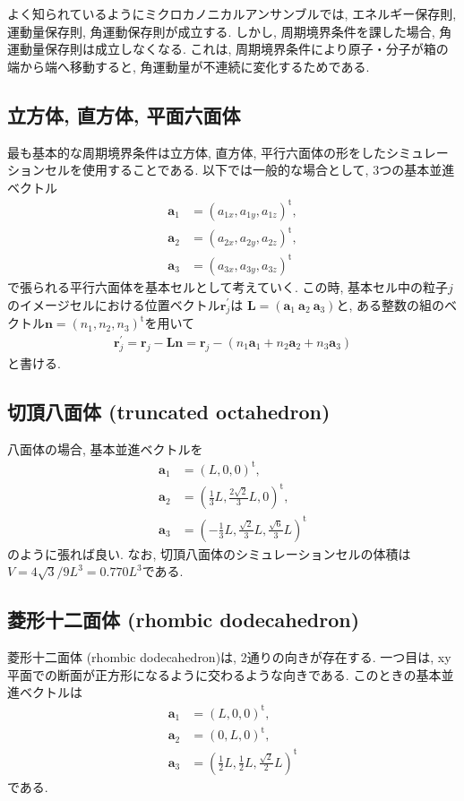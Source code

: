 よく知られているようにミクロカノニカルアンサンブルでは, エネルギー保存則, 運動量保存則, 角運動保存則が成立する.
しかし, 周期境界条件を課した場合, 角運動量保存則は成立しなくなる.
これは, 周期境界条件により原子・分子が箱の端から端へ移動すると, 角運動量が不連続に変化するためである. 

\subsection{立方体, 直方体, 平面六面体}
最も基本的な周期境界条件は立方体, 直方体, 平行六面体の形をしたシミュレーションセルを使用することである. 以下では一般的な場合として, 3つの基本並進ベクトル
\begin{align}
 \bm{a}_{1} &= (a_{1x}, a_{1y}, a_{1z})^{\mathrm{t}}, \\
 \bm{a}_{2} &= (a_{2x}, a_{2y}, a_{2z})^{\mathrm{t}}, \\
 \bm{a}_{3} &= (a_{3x}, a_{3y}, a_{3z})^{\mathrm{t}}
\end{align}
で張られる平行六面体を基本セルとして考えていく.
この時, 基本セル中の粒子$j$のイメージセルにおける位置ベクトル$\bm{r}_{j}^{\prime}$は
$\bm{L}=(\bm{a}_{1}~\bm{a}_{2}~\bm{a}_{3})$と,
ある整数の組のベクトル$\bm{n}=(n_{1},n_{2},n_{3})^{\mathrm{t}}$を用いて
\begin{align}
   \bm{r}_{j}^{\prime}
 = \bm{r}_{j} - \bm{Ln}
 = \bm{r}_{j}
  -(n_{1} \bm{a}_{1} +  n_{2}  \bm{a}_{2} + n_{3} \bm{a}_{3})
\end{align}
と書ける.

\subsection{切頂八面体 (truncated octahedron)}
八面体の場合, 基本並進ベクトルを
\begin{align}
  \bm{a}_{1} &= \left(            L,                    0,  0\right)^{\mathrm{t}}, \\
  \bm{a}_{2} &= \left( \frac{1}{3}L, \frac{2\sqrt{2}}{3}L,  0\right)^{\mathrm{t}}, \\
  \bm{a}_{3} &= \left(-\frac{1}{3}L, \frac{ \sqrt{2}}{3}L,\frac{\sqrt{6}}{3}L \right)^\mathrm{t}
\end{align}
のように張れば良い.
なお, 切頂八面体のシミュレーションセルの体積は$V = 4\sqrt{3}/9L^{3} = 0.770 L^{3}$である.

\subsection{菱形十二面体 (rhombic dodecahedron)}
菱形十二面体 (rhombic dodecahedron)は, 2通りの向きが存在する.
一つ目は, xy平面での断面が正方形になるように交わるような向きである.
このときの基本並進ベクトルは
\begin{align}
  \bm{a}_{1} &= \left(L, 0, 0 \right)^{\mathrm{t}}, \\
  \bm{a}_{2} &= \left(0, L, 0 \right)^{\mathrm{t}}, \\
  \bm{a}_{3} &= \left(\frac{1}{2}L, \frac{1}{2}L,\frac{\sqrt{2}}{2}L \right)^\mathrm{t}
\end{align}
である.

